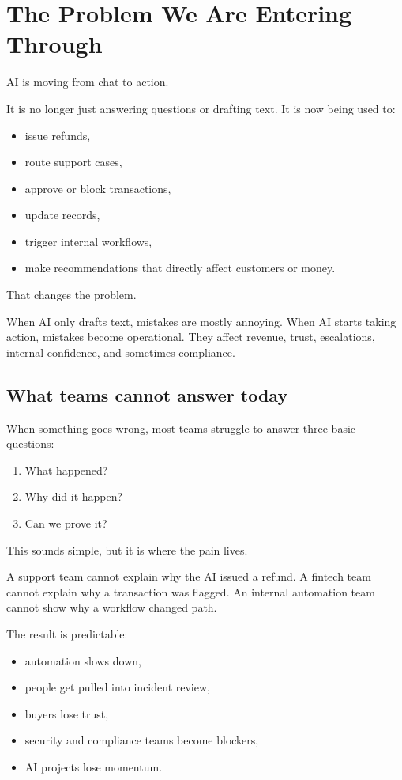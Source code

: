 \chapter{The Problem We Are Entering Through}

AI is moving from chat to action.

It is no longer just answering questions or drafting text.
It is now being used to:

\begin{itemize}
  \item issue refunds,
  \item route support cases,
  \item approve or block transactions,
  \item update records,
  \item trigger internal workflows,
  \item make recommendations that directly affect customers or money.
\end{itemize}

That changes the problem.

When AI only drafts text, mistakes are mostly annoying.
When AI starts taking action, mistakes become operational.
They affect revenue, trust, escalations, internal confidence, and sometimes compliance.

\section{What teams cannot answer today}

When something goes wrong, most teams struggle to answer three basic questions:

\begin{enumerate}
  \item What happened?
  \item Why did it happen?
  \item Can we prove it?
\end{enumerate}

This sounds simple, but it is where the pain lives.

A support team cannot explain why the AI issued a refund.
A fintech team cannot explain why a transaction was flagged.
An internal automation team cannot show why a workflow changed path.

The result is predictable:

\begin{itemize}
  \item automation slows down,
  \item people get pulled into incident review,
  \item buyers lose trust,
  \item security and compliance teams become blockers,
  \item AI projects lose momentum.
\end{itemize}

